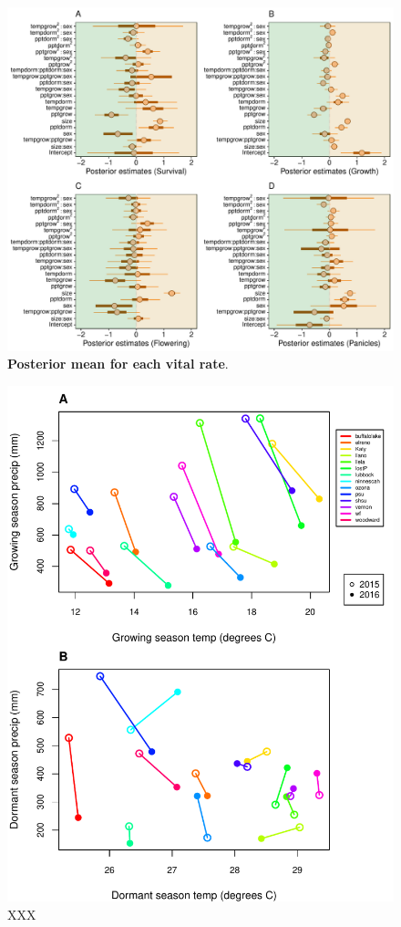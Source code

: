 \documentclass[11pt]{article}\usepackage[]{graphicx}\usepackage[usenames,dvipsnames]{xcolor}
\begin{document}
	
	 \begin{figure}%
		\centering
		\includegraphics[scale = 4.5]{Figures/Posterior_mean.pdf}
		\caption{\textbf{Posterior mean for each vital rate}. }
	\end{figure}
	
\begin{figure}%
	\begin{center}
		\includegraphics[width=0.95\linewidth]{Figures/site_year_weather.pdf}
		\caption{XXX}
		\label{fig:site_year_weather}
	\end{center}
\end{figure}



\end{document}
